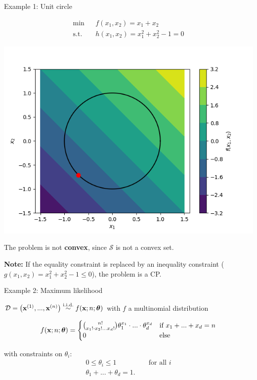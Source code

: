 \begin{vbframe}{Example 1: Unit circle}

\vspace*{-0.3cm} 

\begin{eqnarray*}
  \min && f(x_1, x_2) = x_1 + x_2 \\
  \text{s.t. } && h(x_1,x_2) = x_1^2 + x_2^2 - 1 = 0
\end{eqnarray*}

\begin{center}
  \includegraphics[height=0.3\textwidth, keepaspectratio]{figure_man/unit_circle.png} \\
\end{center}

The problem is not \textbf{convex}, since $\mathcal{S}$ is not a convex set. 

\lz 

\textbf{Note: } If the equality constraint is replaced by an inequality constraint ($g(x_1, x_2) = x_1^2 + x_2^2 - 1 \le 0$), the problem is a CP. 

\end{vbframe}

\begin{vbframe}{Example 2: Maximum likelihood}

$\D = \left(\xi[1], ..., \xi[n]\right) \overset{\text{i.i.d.}}{\sim} f(\xv; n; \thetab)$ with $f$ a multinomial distribution

\begin{footnotesize}
  $$
  f(\xv; n; \thetab) = \begin{cases} \binom{n!}{x_1! \cdot x_2! ... x_d!} \theta_1^{x_1} \cdot ... \cdot \theta_d^{x_d} & \text{if } x_1 + ... + x_d = n \\ 0 & \text{else}
  \end{cases}
  $$
\end{footnotesize}

with constraints on $\theta_i$: 
\begin{eqnarray*}
	0 \le \theta_i \le 1 && \text{ for all } i \\
	 \theta_1 + ... + \theta_d = 1. &&
\end{eqnarray*}



\end{vbframe}




